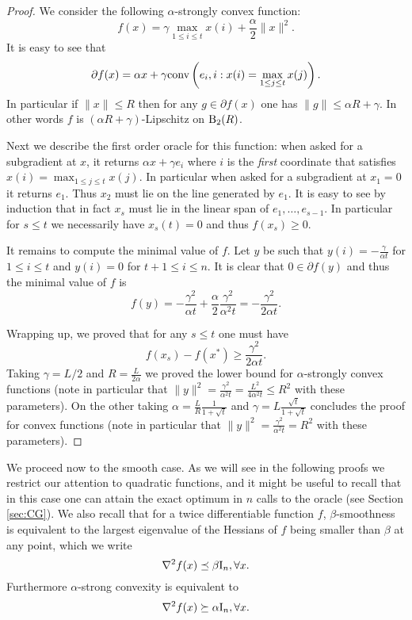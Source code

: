 \begin{proof}
We consider the following $\alpha$-strongly convex function:
$$f(x) = \gamma \max_{1 \leq i \leq t} x(i) + \frac{\alpha}{2} \|x\|^2 .$$
It is easy to see that
$$\partial f(x) = \alpha x + \gamma \mathrm{conv}\left(e_i , i : x(i) = \max_{1 \leq j \leq t} x(j) \right).$$
In particular if $\|x\| \leq R$ then for any $g \in \partial f(x)$ one has $\|g\| \leq \alpha R + \gamma$. In other words $f$ is $(\alpha R + \gamma)$-Lipschitz on $\mathrm{B}_2(R)$.

Next we describe the first order oracle for this function: when asked for a subgradient at $x$, it returns $\alpha x + \gamma e_{i}$ where $i$ is the {\em first} coordinate that satisfies $x(i) = \max_{1 \leq j \leq t} x(j)$. In particular when asked for a subgradient at $x_1=0$ it returns $e_1$. Thus $x_2$ must lie on the line generated by $e_1$. It is easy to see by induction that in fact $x_s$ must lie in the linear span of $e_1, \hdots, e_{s-1}$. In particular for $s \leq t$ we necessarily have $x_s(t) = 0$ and thus $f(x_s) \geq 0$.

It remains to compute the minimal value of $f$. Let $y$ be such that $y(i) = - \frac{\gamma}{\alpha t}$ for $1 \leq i \leq t$ and $y(i) = 0$ for $t+1 \leq i \leq n$. It is clear that $0 \in \partial f(y)$ and thus the minimal value of $f$ is
$$f(y) = - \frac{\gamma^2}{\alpha t} + \frac{\alpha}{2} \frac{\gamma^2}{\alpha^2 t} = - \frac{\gamma^2}{2 \alpha t} .$$ 

Wrapping up, we proved that for any $s \leq t$ one must have
$$f(x_s) - f(x^*) \geq \frac{\gamma^2}{2 \alpha t} .$$
Taking $\gamma = L/2$ and $R= \frac{L}{2 \alpha}$ we proved the lower bound for $\alpha$-strongly convex functions (note in particular that $\|y\|^2 = \frac{\gamma^2}{\alpha^2 t} = \frac{L^2}{4 \alpha^2 t} \leq R^2$ with these parameters). On the other taking $\alpha = \frac{L}{R} \frac{1}{1 + \sqrt{t}}$ and $\gamma = L \frac{\sqrt{t}}{1 + \sqrt{t}}$ concludes the proof for convex functions (note in particular that $\|y\|^2 = \frac{\gamma^2}{\alpha^2 t} = R^2$ with these parameters).
\end{proof}

We proceed now to the smooth case. As we will see in the following proofs we restrict our attention to quadratic functions, and it might be useful to recall that in this case one can attain the exact optimum in $n$ calls to the oracle (see Section \ref{sec:CG}). We also recall that for a twice differentiable function $f$, $\beta$-smoothness is equivalent to the largest eigenvalue of the Hessians of $f$ being smaller than $\beta$ at any point, which we write
$$\nabla^2 f(x) \preceq \beta \mathrm{I}_n , \forall x .$$
Furthermore $\alpha$-strong convexity is equivalent to 
$$\nabla^2 f(x) \succeq \alpha \mathrm{I}_n , \forall x .$$


